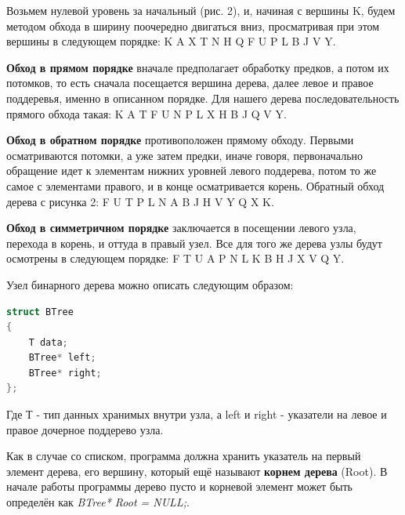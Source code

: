 Возьмем нулевой уровень за начальный (рис. 2), и, начиная с вершины K, будем методом обхода в ширину поочередно двигаться вниз, просматривая при этом вершины в следующем порядке: K A X T N H Q F U P L B J V Y.

{\bf Обход в прямом порядке} вначале предполагает обработку предков, а потом их потомков, то есть сначала посещается вершина дерева, далее левое и правое поддеревья, именно в описанном порядке. Для нашего дерева последовательность прямого обхода такая: K A T F U N P L X H B J Q V Y.

{\bf Обход в обратном порядке} противоположен прямому обходу. Первыми осматриваются потомки, а уже затем предки, иначе говоря, первоначально обращение идет к элементам нижних уровней левого поддерева, потом то же самое с элементами правого, и в конце осматривается корень. Обратный обход дерева с рисунка 2: F U T P L N A B J H V Y Q X K.

{\bf Обход в симметричном порядке} заключается в посещении левого узла, перехода в корень, и оттуда в правый узел. Все для того же дерева узлы будут осмотрены в следующем порядке: F T U A P N L K B H J X V Q Y.

Узел бинарного дерева можно описать следующим образом:
\begin{lstlisting}[language=C++, caption="Описание узла бинарного дерева на С++"]
struct BTree
{
	T data;
	BTree* left;
	BTree* right;
};
\end{lstlisting}

Где Т - тип данных хранимых внутри узла, а left и right - указатели на левое и правое дочерное поддерево узла.

Как в случае со списком, программа должна хранить указатель на первый элемент дерева, его вершину, который ещё называют {\bf корнем дерева} (Root). В начале работы программы дерево пусто и корневой элемент может быть определён как {\it BTree* Root = NULL;}.

